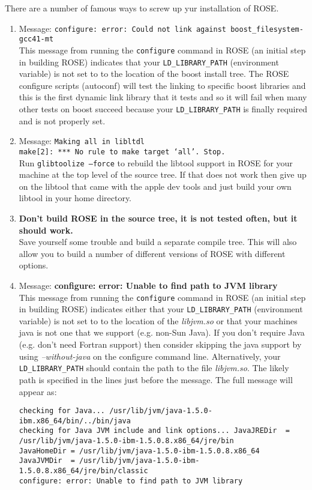    There are a number of famous ways to screw up yur installation of ROSE.
\begin{enumerate}
   \item Message: {\tt configure: error: Could not link against boost\_filesystem-gcc41-mt} \\
   This message from running the {\tt configure} command in ROSE (an initial step in building
   ROSE) indicates that your {\tt LD\_LIBRARY\_PATH} (environment variable) is not set to 
   to the location of the boost install tree.  The ROSE configure scripts (autoconf) will
   test the linking to specific boost libraries and this is the first dynamic link library 
   that it tests and so it will fail when many other tests on boost succeed because your
   {\tt LD\_LIBRARY\_PATH} is finally required and is not properly set.

   \item Message: {\tt Making all in libltdl \\
      make[2]: *** No rule to make target `all'.  Stop.} \\
   Run {\tt glibtoolize --force} to rebuild the libtool support in ROSE for your machine 
   at the top level of the source tree. If that does not work then give up on the libtool 
   that came with the apple dev tools and just build your own libtool in your home directory.

   \item {\bf Don't build ROSE in the source tree, it is not tested often, but it should work.} \\
    Save yourself some trouble and build a separate compile tree.  This will also allow
    you to build a number of different versions of ROSE with different options.

    \item Message: {\bf configure: error: Unable to find path to JVM library} \\
   This message from running the {\tt configure} command in ROSE (an initial step in building
   ROSE) indicates either that your {\tt LD\_LIBRARY\_PATH} (environment variable) is not set to 
   to the location of the {\em libjvm.so} or that your machines java is not one that we
   support (e.g. non-Sun Java).  If you don't require Java (e.g. don't need Fortran
   support) then consider skipping the java support by using {\em --without-java} on the
   configure command line.
   Alternatively, your {\tt LD\_LIBRARY\_PATH} should contain the path to the file 
   {\em libjvm.so}.  The likely path is specified in the lines just before the message.  
   The full message will appear as:
\begin{verbatim}
checking for Java... /usr/lib/jvm/java-1.5.0-ibm.x86_64/bin/../bin/java
checking for Java JVM include and link options... JavaJREDir  = /usr/lib/jvm/java-1.5.0-ibm-1.5.0.8.x86_64/jre/bin
JavaHomeDir = /usr/lib/jvm/java-1.5.0-ibm-1.5.0.8.x86_64
JavaJVMDir  = /usr/lib/jvm/java-1.5.0-ibm-1.5.0.8.x86_64/jre/bin/classic
configure: error: Unable to find path to JVM library
\end{verbatim}


\end{enumerate}
